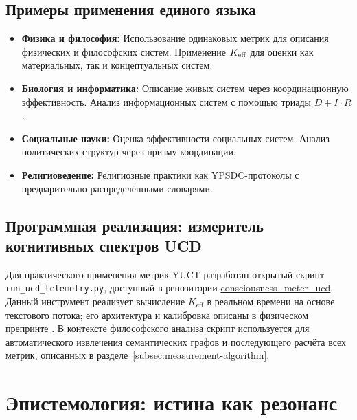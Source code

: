 \documentclass[12pt,a4paper]{article}
\begin{document}
	\subsection{Примеры применения единого языка}
	
	\begin{itemize}
		\item \textbf{Физика и философия:} Использование одинаковых метрик для описания физических и философских систем. Применение \(\Keff\) для оценки как материальных, так и концептуальных систем.
		\item \textbf{Биология и информатика:} Описание живых систем через координационную эффективность. Анализ информационных систем с помощью триады \(D + I \cdot R\).
		\item \textbf{Социальные науки:} Оценка эффективности социальных систем. Анализ политических структур через призму координации.
		\item \textbf{Религиоведение:} Религиозные практики как YPSDC-протоколы с предварительно распределёнными словарями.
	\end{itemize}
	
	\subsection{Программная реализация: измеритель когнитивных спектров UCD}
	\label{subsec:ucd-software}
	
	Для практического применения метрик YUCT разработан открытый скрипт \texttt{run\_ucd\_telemetry.py}, доступный в репозитории \href{https://github.com/Alexey-Yakushev-YUCT/consciousness_meter_ucd}{consciousness\_meter\_ucd}. Данный инструмент реализует вычисление \(K_{\mathrm{eff}}\) в реальном времени на основе текстового потока; его архитектура и калибровка описаны в физическом препринте \cite{Yakushev2026b}. В контексте философского анализа скрипт используется для автоматического извлечения семантических графов и последующего расчёта всех метрик, описанных в разделе~\ref{subsec:measurement-algorithm}.
	
	
	\section{Эпистемология: истина как резонанс}
	
\end{document}
